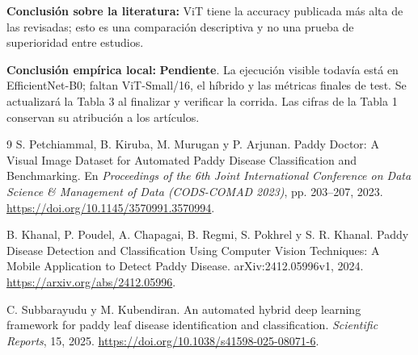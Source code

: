 \documentclass[11pt,a4paper]{article}
\newcommand{\pendiente}{\textcolor{orange!70!black}{\textbf{Pendiente}}}
\begin{document}
\noindent\textbf{Conclusión sobre la literatura:} ViT tiene la accuracy publicada más alta de las revisadas; esto es una comparación descriptiva y no una prueba de superioridad entre estudios.

\noindent\textbf{Conclusión empírica local:} \pendiente. La ejecución visible todavía está en EfficientNet-B0; faltan ViT-Small/16, el híbrido y las métricas finales de test. Se actualizará la Tabla 3 al finalizar y verificar la corrida. Las cifras de la Tabla 1 conservan su atribución a los artículos.

\begin{thebibliography}{9}
S. Petchiammal, B. Kiruba, M. Murugan y P. Arjunan.
\newblock Paddy Doctor: A Visual Image Dataset for Automated Paddy Disease Classification and Benchmarking.
\newblock En \emph{Proceedings of the 6th Joint International Conference on Data Science \& Management of Data (CODS-COMAD 2023)}, pp. 203--207, 2023.
\newblock \url{https://doi.org/10.1145/3570991.3570994}.

B. Khanal, P. Poudel, A. Chapagai, B. Regmi, S. Pokhrel y S. R. Khanal.
\newblock Paddy Disease Detection and Classification Using Computer Vision Techniques: A Mobile Application to Detect Paddy Disease.
\newblock arXiv:2412.05996v1, 2024.
\newblock \url{https://arxiv.org/abs/2412.05996}.

C. Subbarayudu y M. Kubendiran.
\newblock An automated hybrid deep learning framework for paddy leaf disease identification and classification.
\newblock \emph{Scientific Reports}, 15, 2025.
\newblock \url{https://doi.org/10.1038/s41598-025-08071-6}.
\end{thebibliography}
\end{document}
